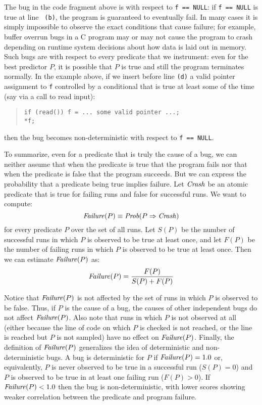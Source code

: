 The bug in the code fragment above is  with
respect to {\tt f == NULL}: if {\tt f == NULL} is true at line {\tt
(b)}, the program is guaranteed to eventually fail.  In many cases it
is simply impossible to observe the exact conditions that cause
failure; for example, buffer overrun bugs in a C program may or may
not cause the program to crash depending on runtime system decisions
about how data is laid out in memory.  Such bugs are
 with respect to every predicate that we instrument:
even for the best predictor $P$, it is possible that $P$ is true and
still the program terminates normally.  In the example above, if we insert before line
{\tt (d)} a valid pointer  assignment to {\tt f} controlled by a conditional that is true
at least some of the time (say via a call to read input):
\begin{quote}
\begin{verbatim}
if (read()) f = ... some valid pointer ...;
*f;
\end{verbatim}
\end{quote}
then the bug becomes non-deterministic with respect to {\tt f == NULL}.

To summarize, even for a predicate that is truly the cause of a bug, we can neither assume that
when the predicate is true that
the program fails nor that when the predicate is false that
the program succeeds. But we can express the probability that a predicate
being true implies failure.  Let $\mbox{\textit{Crash}}$ be an atomic predicate that is
true for failing runs and false for successful runs.  We want to compute:
\[ \mbox{\textit{Failure}}(P) \equiv \mbox{\textit{Prob}}(P \Rightarrow \mbox{\textit{Crash}}) \]
for every predicate $P$ over the set of all runs.  Let $S(P)$ be the number
of successful runs in which $P$ is observed to be true at least once, and let $F(P)$ be the number of
failing runs in which $P$ is observed to be true at least once.  Then we can
estimate $\mbox{\textit{Failure}}(P)$ as:
\[ \mbox{\textit{Failure}}(P) = \frac{F(P)}{S(P) + F(P)} \]

Notice that $\mbox{\textit{Failure}}(P)$ is not affected by the set of runs in which
$P$ is observed to be false.  Thus, if $P$ is the cause of a bug, the
causes of other independent bugs do not affect $\mbox{\textit{Failure}}(P)$.
Also note that runs in which $P$ is not observed at all (either because
the line of code on which $P$ is checked is not reached, or the line is reached
but $P$ is not sampled) have no effect on $\mbox{\textit{Failure}}(P)$.
Finally, the definition of $\mbox{\textit{Failure}}(P)$
generalizes the idea of deterministic and non-deterministic bugs.  A
bug is deterministic for $P$ if $\mbox{\textit{Failure}}(P) = 1.0$ or, equivalently,
$P$ is never observed to be true in a successful run ($S(P) =
0$) and $P$ is observed to be true in at least one failing run ($F(P) > 0$).
If $\mbox{\textit{Failure}}(P) < 1.0$ then the bug is non-deterministic, with
lower scores showing weaker correlation between the predicate and
program failure.

